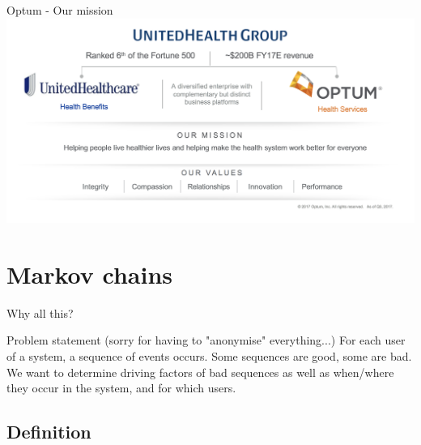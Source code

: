 \documentclass[10pt]{beamer}
\begin{document}
	
	\begin{frame}{Optum - Our mission}
		\includegraphics[width=\textwidth]{imgs/optum-mission.png}
	\end{frame}
	
	
	\section{Markov chains}
	
	\begin{frame}{Why all this?}
	 \begin{block}{Problem statement (sorry for having to "anonymise" everything...)}
		For each user of a system, a sequence of events occurs. Some sequences are good, some are bad. We want to determine driving factors of bad sequences as well as when/where they occur in the system, and for which users.
	 \end{block}
	\end{frame}		
	
	\subsection{Definition}
\end{document}
